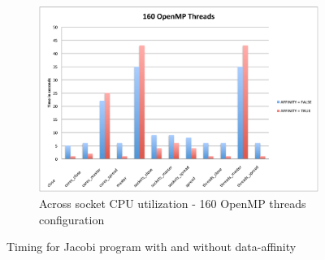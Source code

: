 \begin{figure}[!h]
      \begin{subfigure}[b]{0.5\textwidth}
        \includegraphics[width=\textwidth]{./Images/J160_time_bar}
        \caption{Across socket CPU utilization - 160 OpenMP threads configuration}
        \label{fig:J160}
    \end{subfigure}
    \caption{Timing for Jacobi program with and without data-affinity}\label{fig:Jacobi}
\end{figure}